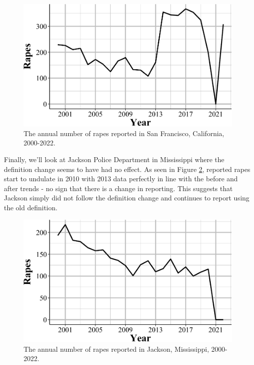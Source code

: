 \documentclass[
  12pt,
  openany]{book}
\begin{document}
\begin{figure}

{\centering \includegraphics[width=0.9\linewidth]{03_offenses_known_files/figure-latex/rapeLA-1} 

}

\caption{The annual number of rapes reported in San Francisco, California, 2000-2022.}\label{fig:rapeLA}
\end{figure}

Finally, we'll look at Jackson Police Department in Mississippi where the definition change seems to have had no effect. As seen in Figure \ref{fig:rapeJackson}, reported rapes start to undulate in 2010 with 2013 data perfectly in line with the before and after trends - no sign that there is a change in reporting. This suggests that Jackson simply did not follow the definition change and continues to report using the old definition.

\begin{figure}

{\centering \includegraphics[width=0.9\linewidth]{03_offenses_known_files/figure-latex/rapeJackson-1} 

}

\caption{The annual number of rapes reported in Jackson, Mississippi, 2000-2022.}\label{fig:rapeJackson}
\end{figure}
\end{document}
